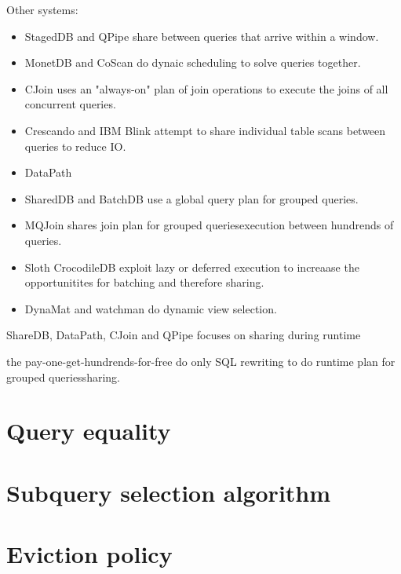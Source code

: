 Other systems:

\begin{itemize}
\item StagedDB \cite{harizopoulosStagedDBDesigningDatabase2005} and QPipe
\cite{harizopoulosQpipeSimultaneouslyPipelined2005} share between
queries that arrive within a window.
\item MonetDB \cite{idreosMonetdbTwoDecades2012} and CoScan
\cite{wangCoscanCooperativeScan2011} do dynaic scheduling to solve
queries together.
\item CJoin \cite{candeaScalablePredictableJoin2009} uses an "always-on"
plan of join operations to execute the joins of all concurrent
queries.
\item Crescando \cite{ssgiannikisCrescando2010} and IBM Blink
\cite{ramanConstanttimeQueryProcessing2008} attempt to share
individual table scans between queries to reduce IO.
\item DataPath \cite{arumugamDataPathSystemDatacentric2010}
\item SharedDB \cite{giannikisSharedDBKillingOne2012} and BatchDB
\cite{makreshanskiBatchDBEfficientIsolated2017} use a global query
plan for grouped queries.
\item MQJoin \cite{makreshanskiMqjoinEfficientShared2016a} shares join
plan for grouped queriesexecution between hundrends of queries.
\item Sloth \cite{cheungSlothBeingLazy2016} CrocodileDB
\cite{shangCrocodileDBEfficientDatabase2020} exploit lazy or deferred
execution to increaase the opportunitites for batching and therefore
sharing.
\item DynaMat \cite{kotidisDynamatDynamicView1999} and watchman
\cite{scheuermannWatchmanDataWarehouse1996} do dynamic view
selection.
\end{itemize}

ShareDB, DataPath, CJoin and QPipe focuses on sharing during runtime

the pay-one-get-hundrends-for-free do only SQL rewriting to do runtime
  plan for grouped queriessharing.


\cite{mounaProResProactiveReselection2022}


\section{Query equality}
\label{sec:orga919a5f}

\section{Subquery selection algorithm}
\label{sec:org70319fb}

\section{Eviction policy}
\label{sec:orgd16def2}

